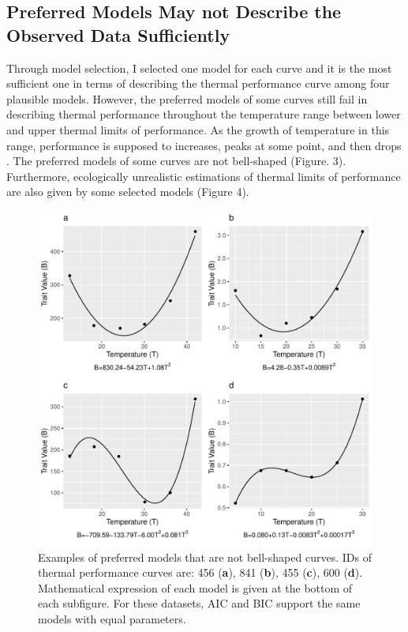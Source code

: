 \documentclass[11pt]{article}
\begin{document}
    \subsection{Preferred Models May not Describe the Observed Data Sufficiently}
    Through model selection, I selected one model for each curve and it is the most sufficient one in terms of describing 
    the thermal performance curve among four plausible models. However, the preferred models of some curves still 
    fail in describing thermal performance throughout the temperature 
    range between lower and upper thermal limits of performance. As the growth of temperature in this range, 
    performance is supposed to increases, peaks at some point, and then drops \cite{sinclair2016can,krenek2011thermal}. 
    The preferred models of some curves are 
    not bell-shaped (Figure. 3). Furthermore, ecologically unrealistic estimations 
    of thermal limits of performance are also given by some selected models (Figure 4). 
     
    \begin{figure}[H]
      \centering
      \includegraphics[width=\textwidth]{../Results/Fig2.pdf}
      \caption{Examples of preferred models that are not bell-shaped curves. IDs of thermal performance curves 
      are: 456 (\textbf{a}), 
      841 (\textbf{b}), 455 (\textbf{c}), 600 (\textbf{d}). Mathematical expression of each model is given at 
      the bottom of each subfigure. For these datasets, AIC and BIC support the same models with equal parameters.} 
    \end{figure}
\end{document}
